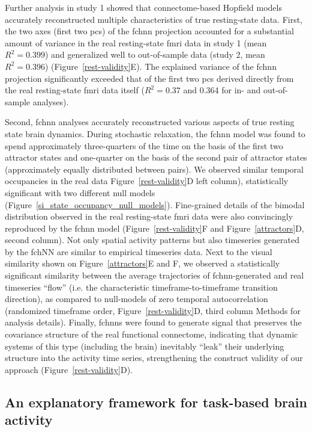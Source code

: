 \documentclass{article}
\begin{document}
Further analysis in study 1 showed that connectome-based Hopfield models accurately reconstructed multiple characteristics of true resting-state data.
First, the two axes (first two \acrshort{pc}s) of the \acrshort{fchnn} projection accounted for a substantial amount of variance in the real resting-state \acrshort{fmri} data in study 1 (mean $R^2=0.399$) and generalized well to out-of-sample data (study 2, mean $R^2=0.396$)  (Figure~\ref{rest-validity}E). The explained variance of the \acrshort{fchnn} projection significantly exceeded that of the first two \acrshort{pc}s derived directly from the real resting-state \acrshort{fmri} data itself ($R^2=0.37$ and 0.364 for in- and out-of-sample analyses).

Second, \acrshort{fchnn} analyses accurately reconstructed various aspects of true resting state brain dynamics.
During stochastic relaxation, the \acrshort{fchnn} model was found to spend approximately three-quarters of the time on the basis of the first two attractor states and one-quarter on the basis of the second pair of attractor states (approximately equally distributed between pairs). We observed similar temporal occupancies in the real data Figure~\ref{rest-validity}D left column), statistically significant with two different null models (Figure~\ref{si_state_occupancy_null_models}). Fine-grained details of the bimodal distribution observed in the real resting-state \acrshort{fmri} data were also convincingly reproduced by the \acrshort{fchnn} model (Figure~\ref{rest-validity}F and Figure~\ref{attractors}D, second column).
Not only spatial activity patterns but also timeseries generated by the fchNN are similar to empirical timeseries data. Next to the visual similarity shown on Figure~\ref{attractors}E and F, we observed a statistically significant similarity between the average trajectories of \acrshort{fchnn}-generated and real timeseries ``flow'' (i.e. the characteristic timeframe-to-timeframe transition direction), as compared to null-models of zero temporal autocorrelation (randomized timeframe order, Figure~\ref{rest-validity}D, third column Methods for analysis details).
Finally, \acrshort{fchnn}s were found to generate signal that preserves the covariance structure of the real functional connectome, indicating that dynamic systems of this type (including the brain) inevitably ``leak'' their underlying structure into the activity time series, strengthening the construct validity of our approach (Figure~\ref{rest-validity}D).

\subsection{An explanatory framework for task-based brain activity}
\end{document}
